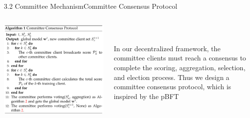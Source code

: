 \documentclass{sintefbeamer}
\theoremstyle{definition}
\begin{document}
\begin{frame}{3.2 Committee Mechanism}{Committee Consensus Protocol}
\begin{columns}
\begin{column}{0.5\textwidth}
\vspace{0.5em}
\includegraphics[width=1\textwidth]{images/algo_ccp}
\end{column}
\begin{column}{0.5\textwidth}
\\ \hspace*{\fill} \\
In our decentralized framework, the committee clients must reach a consensus to complete the scoring, aggregation, selection, and election process. Thus we design a committee consensus protocol, which is inspired by the pBFT
\end{column}
\end{columns}
\end{frame}
\end{document}
